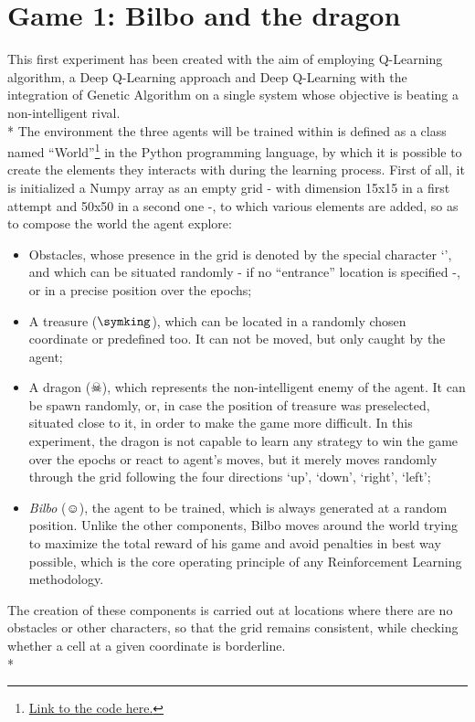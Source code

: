 \section{Game 1: Bilbo and the dragon}
This first experiment has been created with the aim of employing Q-Learning algorithm, a Deep Q-Learning approach and Deep Q-Learning with the integration of Genetic Algorithm on a single system whose objective is beating a non-intelligent rival.\\*
The environment the three agents will be trained within is defined as a class named ``World''\footnote{\href{https://github.com/moiraghif/DragonHunting/blob/master/Bilbo\%20World/CreateBilboWorld.py}{Link to the code here.}} in the Python programming language, by which it is possible to create the elements they interacts with during the learning process. First of all, it is initialized a Numpy array as an empty grid - with dimension 15x15 in a first attempt and 50x50 in a second one -, to which various elements are added, so as to compose the world the agent explore:
\begin{itemize}[noitemsep, topsep=0ex]
  \item Obstacles, whose presence in the grid is denoted by the special character `', and which can be situated randomly - if no ``entrance'' location is specified -, or in a precise position over the epochs;
  \item A treasure ($\symking$), which can be located in a randomly chosen coordinate or predefined too. It can not be moved, but only caught by the agent;
  \item A dragon ($\skull$), which represents the non-intelligent enemy of the agent. It can be spawn randomly, or, in case the position of treasure was preselected, situated close to it, in order to make the game more difficult. In this experiment, the dragon is not capable to learn any strategy to win the game over the epochs or react to agent's moves, but it merely moves randomly through the grid following the four directions `up', `down', `right', `left';
  \item \textit{Bilbo} ($\smiley$), the agent to be trained, which is always generated at a random position. Unlike the other components, Bilbo moves around the world trying to maximize the total reward of his game and avoid penalties in best way possible, which is the core operating principle of any Reinforcement Learning methodology.
\end{itemize}
The creation of these components is carried out at locations where there are no obstacles or other characters, so that the grid remains consistent, while checking whether a cell at a given coordinate is borderline.\\*

